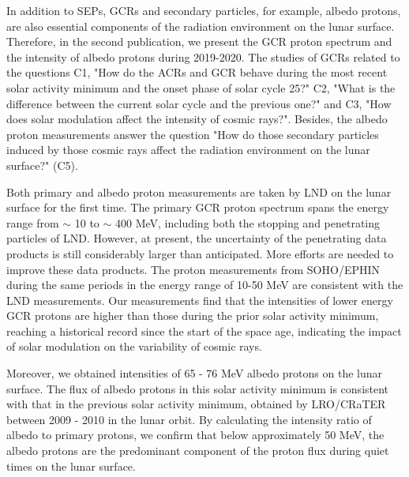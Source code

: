 In addition to \acp{SEP}, \acp{GCR} and secondary particles, for example, albedo protons, are also essential components of the radiation environment on the lunar surface. Therefore, in the second publication, we present the \ac{GCR} proton spectrum and the intensity of albedo protons during 2019-2020. The studies of \acp{GCR} related to the questions C1, "How do the \acp{ACR} and \ac{GCR} behave during the most recent solar activity minimum and the onset phase of solar cycle 25?"
C2, "What is the difference between the current solar cycle and the previous one?" and C3, "How does solar modulation affect the intensity of cosmic rays?". Besides, the albedo proton measurements answer the question "How do those secondary particles induced by those cosmic rays affect the radiation environment on the lunar surface?" (C5).

Both primary and albedo proton measurements are taken by \ac{LND} on the lunar surface for the first time. The primary \ac{GCR} proton spectrum spans the energy range from $\sim$ 10 to $\sim$ 400 MeV, including both the stopping and penetrating particles of \ac{LND}. However, at present, the uncertainty of the penetrating data products is still considerably larger than anticipated. More efforts are needed to improve these data products. The proton measurements from \acs{SOHO}/\acs{EPHIN} during the same periods in the energy range of 10-50 MeV are consistent with the \ac{LND} measurements. Our measurements find that the intensities of lower energy \ac{GCR} protons are higher than those during the prior solar activity minimum, reaching a historical record since the start of the space age, indicating the impact of solar modulation on the variability of cosmic rays.

Moreover, we obtained intensities of 65 - 76 MeV albedo protons on the lunar surface. The flux of albedo protons in this solar activity minimum is consistent with that in the previous solar activity minimum, obtained by \acs{LRO}/\acs{CRaTER} between 2009 - 2010 in the lunar orbit. By calculating the intensity ratio of albedo to primary protons, we confirm that below approximately 50 MeV, the albedo protons are the predominant component of the proton flux during quiet times on the lunar surface. 




